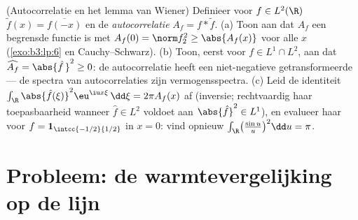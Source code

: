 \begin{exercise}[$\star\star$]\label{exo:b3:fouriertransform:12}
(Autocorrelatie en het lemma van Wiener) Definieer voor $f \in
L^2(\R)$ $\tilde f(x) = \overline{f(-x)}$ en de
\emph{autocorrelatie} $A_f = f * \tilde f$.
(a) Toon aan dat $A_f$ een begrensde  functie is met
$A_f(0) = \norm f_2^2 \geq \abs{A_f(x)}$ voor alle $x$
(\cref{exo:b3:lp:6} en Cauchy--Schwarz).
(b) Toon, eerst voor $f \in L^1\cap L^2$, aan dat
$\widehat{A_f} = \abs{\hat f\,}^2 \geq 0$: de autocorrelatie
heeft een niet-negatieve getransformeerde --- de spectra van
autocorrelaties zijn vermogensspectra.
(c) Leid de identiteit $\int_\R\abs{\hat f(\xi)}^2\eu^{\iu
x\xi}\,\dd\xi = 2\pi A_f(x)$ af (inversie; rechtvaardig haar
toepasbaarheid wanneer $\hat f \in L^2$ voldoet aan $\abs{\hat
f}^2 \in L^1$), en evalueer haar voor $f = \mathbf
1_{\intcc{-1/2}{1/2}}$ in $x = 0$: vind opnieuw
$\int_\R\bigl(\frac{\sin u}u\bigr)^2\dd u = \pi$.
\end{exercise}

\section{Probleem: de warmtevergelijking op de lijn}

